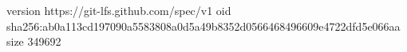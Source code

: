 version https://git-lfs.github.com/spec/v1
oid sha256:ab0a113cd197090a5583808a0d5a49b8352d0566468496609e4722dfd5e066aa
size 349692
